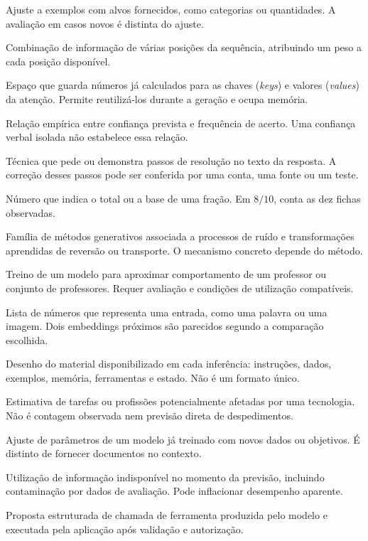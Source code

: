 \begin{description}[style=nextline,leftmargin=0pt,labelindent=0pt,labelsep=0pt,labelwidth=0pt]
\item[Aprendizagem supervisionada] Ajuste a exemplos com alvos fornecidos, como categorias ou quantidades. A avaliação em casos novos é distinta do ajuste.
\item[Atenção (Attention)] Combinação de informação de várias posições da sequência, atribuindo um peso a cada posição disponível.
\item[Cache KV] Espaço que guarda números já calculados para as chaves (\emph{keys}) e valores (\emph{values}) da atenção. Permite reutilizá-los durante a geração e ocupa memória.
\item[Calibração] Relação empírica entre confiança prevista e frequência de acerto. Uma confiança verbal isolada não estabelece essa relação.
\item[Chain-of-Thought (CoT)] Técnica que pede ou demonstra passos de resolução no texto da resposta. A correção desses passos pode ser conferida por uma conta, uma fonte ou um teste.
\item[Denominador] Número que indica o total ou a base de uma fração. Em $8/10$, conta as dez fichas observadas.
\item[Difusão] Família de métodos generativos associada a processos de ruído e transformações aprendidas de reversão ou transporte. O mecanismo concreto depende do método.
\item[Distilação] Treino de um modelo para aproximar comportamento de um professor ou conjunto de professores. Requer avaliação e condições de utilização compatíveis.
\item[Embedding] Lista de números que representa uma entrada, como uma palavra ou uma imagem. Dois embeddings próximos são parecidos segundo a comparação escolhida.
\item[Engenharia de contexto] Desenho do material disponibilizado em cada inferência: instruções, dados, exemplos, memória, ferramentas e estado. Não é um formato único.
\item[Exposição ocupacional] Estimativa de tarefas ou profissões potencialmente afetadas por uma tecnologia. Não é contagem observada nem previsão direta de despedimentos.
\item[Fine-tuning] Ajuste de parâmetros de um modelo já treinado com novos dados ou objetivos. É distinto de fornecer documentos no contexto.
\item[Fuga de informação no treino] Utilização de informação indisponível no momento da previsão, incluindo contaminação por dados de avaliação. Pode inflacionar desempenho aparente.
\item[Function calling] Proposta estruturada de chamada de ferramenta produzida pelo modelo e executada pela aplicação após validação e autorização.

\end{description}
